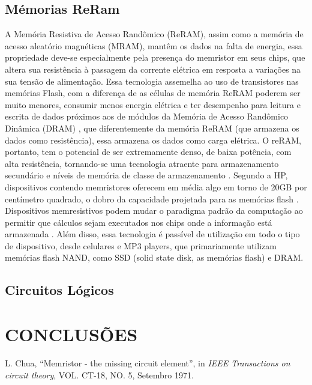 \documentclass{ceel}
\begin{document}
\begin{multicols}{2}
\subsection{Mémorias ReRam}
A Memória Resistiva de Acesso Randômico (ReRAM), assim como a memória de acesso aleatório magnéticas (MRAM), mantêm os dados na falta de energia, essa propriedade deve-se especialmente pela presença do memristor em seus chips, que altera sua resistência à passagem da corrente elétrica em resposta a variações na sua tensão de alimentação.
Essa tecnologia assemelha ao uso de transistores nas memórias Flash, com a diferença de as células de memória ReRAM poderem ser muito menores, consumir menos energia elétrica e ter desempenho para leitura e escrita de dados próximos aos de módulos da Memória de Acesso Randômico Dinâmica (DRAM)\cite{blog} , que diferentemente da memória ReRAM (que armazena os dados como resistência), essa armazena os dados como carga elétrica.
O reRAM, portanto, tem o potencial de ser extremamente denso, de baixa potência, com alta resistência, tornando-se uma tecnologia atraente para armazenamento secundário e níveis de memória de classe de armazenamento \cite{prog}. Segundo a HP, dispositivos contendo memristores oferecem em média algo em torno de 20GB por centímetro quadrado, o dobro da capacidade projetada para as memórias flash \cite{hp}.
Dispositivos memresistivos podem mudar o paradigma padrão da computação ao permitir que cálculos sejam executados nos chips onde a informação está armazenada \cite{hp}. Além disso, essa tecnologia é passível de utilização em todo o tipo de dispositivo, desde celulares e MP3 players, que primariamente utilizam memórias flash NAND, como SSD (solid state disk, as memórias flash) e DRAM.

\subsection{Circuitos Lógicos}



\section{CONCLUSÕES}


\begin{thebibliography}{9}

    L. Chua,
    “Memristor - the missing circuit element”, 
    in \emph{IEEE Transactions on circuit theory}, VOL. CT-18, NO. 5, Setembro 1971.


\end{thebibliography}
\end{multicols}
\end{document}
